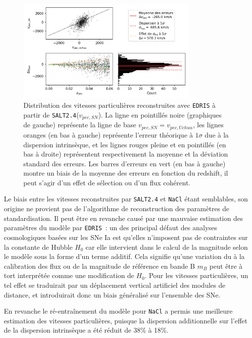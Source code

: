 \documentclass{book}
\def\nacl{\texttt{NaCl}\xspace}
\def\edris{\texttt{EDRIS}\xspace}
\def\saltd{\texttt{SALT2.4}\xspace}
\begin{document}
\begin{figure}
	\centering
	\includegraphics[width=0.8\textwidth]{figures/vp_nacl.png}
	\caption{Distribution des vitesses particulières reconstruites avec \edris à partir de \saltd ($v_{pec,SN}$). La ligne en pointillés noire (graphiques de gauche) représente la ligne de base $v_{pec, SN} = v_{pec, Uchuu}$, les lignes oranges (en bas à gauche) représente l'erreur théorique à $1\sigma$ due à la dispersion intrinsèque, et les lignes rouges pleine et en pointillés (en bas à droite) représentent respectivement la moyenne et la déviation standard des erreurs. Les barres d'erreurs en vert (en bas à gauche) montre un biais de la moyenne des erreurs en fonction du redshift, il peut s'agir d'un effet de sélection ou d'un flux cohérent.}
	\label{fig:vp_nacl}
\end{figure}


Le biais entre les vitesses reconstruites par \saltd et \nacl étant semblables, son origine ne provient pas de l'algorithme de reconstruction des paramètres de standardisation. Il peut être en revanche causé par une mauvaise estimation des paramètres du modèle par \edris~: un des principal défaut des analyses cosmologiques basées sur les SNe Ia est qu'elles n'imposent pas de contraintes sur la constante de Hubble $H_0$ car elle intervient dans le calcul de la magnitude selon le modèle sous la forme d'un terme additif. Cela signifie qu'une variation du à la calibration des flux ou de la magnitude de référence en bande B $m_B$ peut être à tort interprétée comme une modification de $H_0$. Pour les vitesses particulières, un tel effet se traduirait par un déplacement vertical artificiel des modules de distance, et introduirait donc un biais généralisé sur l'ensemble des SNe.

En revanche le ré-entraînement du modèle pour \nacl a permis une meilleure estimation des vitesses particulières, puisque la dispersion additionnelle sur l'effet de la dispersion intrinsèque a été réduit de 38\% à 18\%.
\end{document}
